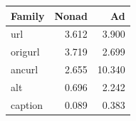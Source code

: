 \begin{tabular}{lrr}\toprule
Family & Nonad & Ad\\\midrule
url & 3.612 & 3.900\\
origurl & 3.719 & 2.699\\
ancurl & 2.655 & 10.340\\
alt & 0.696 & 2.242\\
caption & 0.089 & 0.383\\
\bottomrule\end{tabular}
